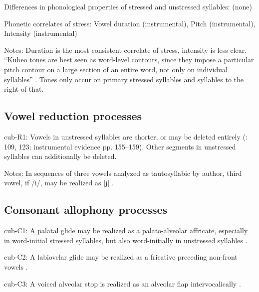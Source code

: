 {\begin{appendixdesc}
\item[Differences in phonological properties of stressed and unstressed syllables:] (none)

\item[Phonetic correlates of stress:] Vowel duration (instrumental), Pitch (instrumental), Intensity (instrumental)

\item[Notes:] Duration is the most consistent correlate of stress, intensity is less clear. ``Kubeo tones are best seen as word-level contours, since they impose a particular pitch contour on a large section of an entire word, not only on individual syllables'' \citep[134]{Chacon2012}. Tones only occur on primary stressed syllables and syllables to the right of that.
\end{appendixdesc}
\subsection*{Vowel reduction processes}
\begin{appendixdesc}

\item[cub-R1:] Vowels in unstressed syllables are shorter, or may be deleted entirely (\citealt{Chacon2012}: 109, 123; instrumental evidence pp. 155--159). Other segments in unstressed syllables can additionally be deleted.

\item[Notes:] In sequences of three vowels analyzed as tautosyllabic by author, third vowel, if /i/, may be realized as [j] \citep[52]{Chacon2012}.
\end{appendixdesc}
\subsection*{Consonant allophony processes}
\begin{appendixdesc}

\item[cub-C1:] A palatal glide may be realized as a palato-alveolar affricate, especially in word-initial stressed syllables, but also word-initially in unstressed syllables \citep[67]{Chacon2012}.

\item[cub-C2:] A labiovelar glide may be realized as a fricative preceding non-front vowels \citep[63]{Chacon2012}.

\item[cub-C3:] A voiced alveolar stop is realized as an alveolar flap intervocalically \citep[63]{Chacon2012}.


\end{appendixdesc}}
